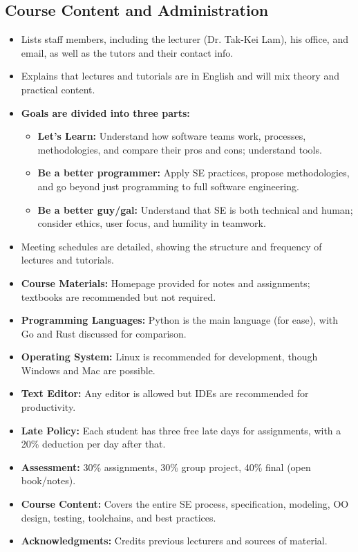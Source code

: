 \documentclass[11pt,a4paper]{article}
\begin{document}
\subsection*{Course Content and Administration}
\begin{itemize}
    \item Lists staff members, including the lecturer (Dr. Tak-Kei Lam), his office, and email, as well as the tutors and their contact info.
    \item Explains that lectures and tutorials are in English and will mix theory and practical content.
    \item \textbf{Goals are divided into three parts:}
        \begin{itemize}
            \item \textbf{Let’s Learn:} Understand how software teams work, processes, methodologies, and compare their pros and cons; understand tools.
            \item \textbf{Be a better programmer:} Apply SE practices, propose methodologies, and go beyond just programming to full software engineering.
            \item \textbf{Be a better guy/gal:} Understand that SE is both technical and human; consider ethics, user focus, and humility in teamwork.
        \end{itemize}
    \item Meeting schedules are detailed, showing the structure and frequency of lectures and tutorials.
    \item \textbf{Course Materials:} Homepage provided for notes and assignments; textbooks are recommended but not required.
    \item \textbf{Programming Languages:} Python is the main language (for ease), with Go and Rust discussed for comparison.
    \item \textbf{Operating System:} Linux is recommended for development, though Windows and Mac are possible.
    \item \textbf{Text Editor:} Any editor is allowed but IDEs are recommended for productivity.
    \item \textbf{Late Policy:} Each student has three free late days for assignments, with a 20\% deduction per day after that.
    \item \textbf{Assessment:} 30\% assignments, 30\% group project, 40\% final (open book/notes).
    \item \textbf{Course Content:} Covers the entire SE process, specification, modeling, OO design, testing, toolchains, and best practices.
    \item \textbf{Acknowledgments:} Credits previous lecturers and sources of material.
\end{itemize}
\end{document}
